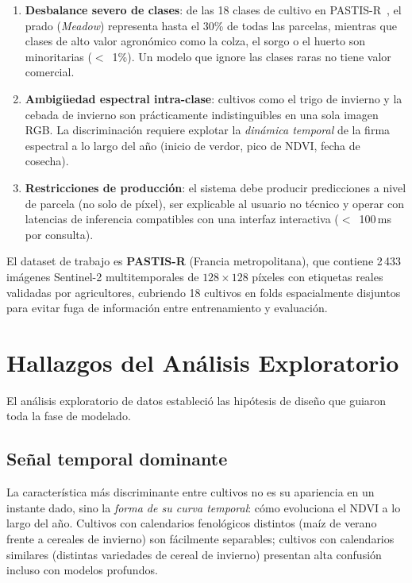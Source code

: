 \documentclass{article}
\begin{document}
\begin{enumerate}[leftmargin=*]
    \item \textbf{Desbalance severo de clases}: de las 18 clases de cultivo
    en PASTIS-R~\cite{garnot2021pastis}, el prado (\textit{Meadow})
    representa hasta el 30\% de todas las parcelas, mientras que clases de
    alto valor agronómico como la colza, el sorgo o el huerto son
    minoritarias ($<$~1\%). Un modelo que ignore las clases raras no tiene
    valor comercial.

    \item \textbf{Ambigüedad espectral intra-clase}: cultivos como el trigo
    de invierno y la cebada de invierno son prácticamente indistinguibles en
    una sola imagen RGB. La discriminación requiere explotar la
    \textit{dinámica temporal} de la firma espectral a lo largo del año
    (inicio de verdor, pico de NDVI, fecha de cosecha).

    \item \textbf{Restricciones de producción}: el sistema debe producir
    predicciones a nivel de parcela (no solo de píxel), ser explicable al
    usuario no técnico y operar con latencias de inferencia compatibles con
    una interfaz interactiva ($<$~100\,ms por consulta).
\end{enumerate}

El dataset de trabajo es \textbf{PASTIS-R} (Francia metropolitana), que
contiene 2\,433 imágenes Sentinel-2 multitemporales de $128\times128$
píxeles con etiquetas reales validadas por agricultores, cubriendo 18
cultivos en folds espacialmente disjuntos para evitar fuga de información
entre entrenamiento y evaluación.

\section{Hallazgos del Análisis Exploratorio}

El análisis exploratorio de datos estableció las hipótesis de
diseño que guiaron toda la fase de modelado.

\subsection{Señal temporal dominante}
La característica más discriminante entre cultivos no es su apariencia en
un instante dado, sino la \textit{forma de su curva temporal}: cómo
evoluciona el NDVI a lo largo del año. Cultivos con calendarios fenológicos
distintos (maíz de verano frente a cereales de invierno) son fácilmente
separables; cultivos con calendarios similares (distintas variedades de
cereal de invierno) presentan alta confusión incluso con modelos profundos.
\end{document}
